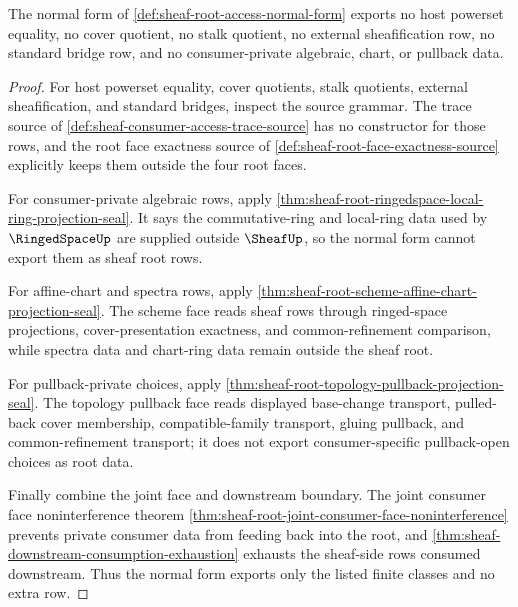 \begin{theorem}
\label{thm:sheaf-root-access-normal-form-no-extra-rows}
The normal form of \autoref{def:sheaf-root-access-normal-form} exports no host powerset equality, no cover quotient, no stalk quotient, no external sheafification row, no standard bridge row, and no consumer-private algebraic, chart, or pullback data.
\end{theorem}
\begin{proof}
For host powerset equality, cover quotients, stalk quotients, external sheafification, and standard bridges, inspect the source grammar. The trace source of \autoref{def:sheaf-consumer-access-trace-source} has no constructor for those rows, and the root face exactness source of \autoref{def:sheaf-root-face-exactness-source} explicitly keeps them outside the four root faces.

For consumer-private algebraic rows, apply \autoref{thm:sheaf-root-ringedspace-local-ring-projection-seal}. It says the commutative-ring and local-ring data used by $\RingedSpaceUp$ are supplied outside $\SheafUp$, so the normal form cannot export them as sheaf root rows.

For affine-chart and spectra rows, apply \autoref{thm:sheaf-root-scheme-affine-chart-projection-seal}. The scheme face reads sheaf rows through ringed-space projections, cover-presentation exactness, and common-refinement comparison, while spectra data and chart-ring data remain outside the sheaf root.

For pullback-private choices, apply \autoref{thm:sheaf-root-topology-pullback-projection-seal}. The topology pullback face reads displayed base-change transport, pulled-back cover membership, compatible-family transport, gluing pullback, and common-refinement transport; it does not export consumer-specific pullback-open choices as root data.

Finally combine the joint face and downstream boundary. The joint consumer face noninterference theorem \autoref{thm:sheaf-root-joint-consumer-face-noninterference} prevents private consumer data from feeding back into the root, and \autoref{thm:sheaf-downstream-consumption-exhaustion} exhausts the sheaf-side rows consumed downstream. Thus the normal form exports only the listed finite classes and no extra row.
\end{proof}
